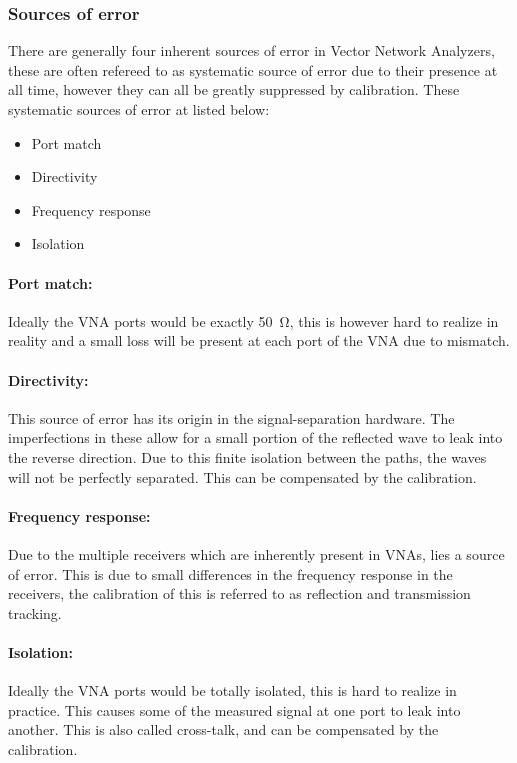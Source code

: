 \subsubsection{Sources of error}
There are generally four inherent sources of error in Vector Network Analyzers, these are often refereed to as systematic source of error due to their presence at all time, however they can all be greatly suppressed by calibration\cite{nationalInstruVNA}. These systematic sources of error at listed below: 
 
\begin{itemize}
\item Port match
\item Directivity
\item Frequency response
\item Isolation 
\end{itemize}

\paragraph{Port match:} Ideally the VNA ports would be exactly \SI{50}{\ohm}, this is however hard to realize in reality and a small loss will be present at each port of the VNA due to mismatch\cite{nationalInstruVNA}.

\paragraph{Directivity:} This source of error has its origin in the signal-separation hardware. The imperfections in these allow for a small portion of the reflected wave to leak into the reverse direction. Due to this finite isolation between the paths, the waves will not be perfectly separated. This can be compensated by the calibration\cite{nationalInstruVNA}. 
\paragraph{Frequency response:} Due to the multiple receivers which are inherently present in VNAs, lies a source of error. This is due to small differences in the frequency response in the receivers, the calibration of this is referred to as reflection and transmission tracking\cite{nationalInstruVNA}.   
\paragraph{Isolation:} Ideally the VNA ports would be totally isolated, this is hard to realize in practice. This causes some of the measured signal at one port to leak into another. This is also called cross-talk, and can be compensated by the calibration\cite{nationalInstruVNA}. 

